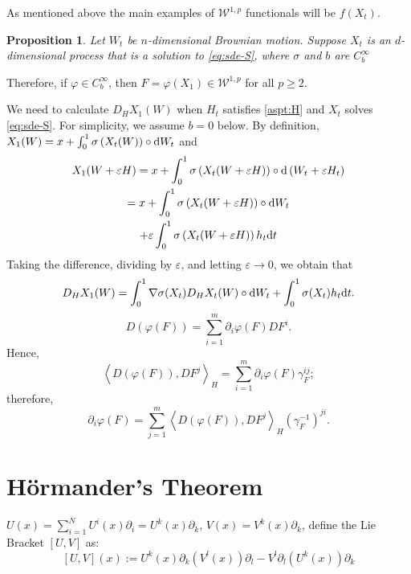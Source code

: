 \documentclass[twoside, 12pt]{book}
\numberwithin{equation}{chapter}
\newtheorem{proposition}[theorem]{Proposition}
\def\sW{{\mathscr W}}
\def\geq{\geqslant}
\def\p{\partial}
\def\d{\text{\rm{d}}}
\def\eps{\varepsilon}
\begin{document}
    As mentioned above the main examples of $\sW^{1,p}$ functionals will be $f(X_t)$.
    \begin{proposition}
        Let $W_t$ be $n$-dimensional Brownian motion. Suppose $X_t$ is an $d$-dimensional process that is a solution to \eqref{eq:sde-S}, where $\sigma$ and $b$ are $C^{\infty}_b$
    \end{proposition}
    Therefore, if $\varphi\in C^\infty_b$, then $F=\varphi\left(X_1\right)\in \sW^{1,p}$ for all $p \geq 2$. 

    
    We need to calculate $D_HX_1(W)$ when $H_t$ satisfies \eqref{aspt:H} and $X_t$ solves \eqref{eq:sde-S}. For simplicity, we assume $b=0$ below. By definition, $X_1(W)=x+\int_0^1 \sigma\left(X_t(W)\right) \circ \d W_t$ and 
    \begin{equation*}
    \begin{gathered}
    X_1(W+\varepsilon H)=x+\int_0^1 \sigma\left(X_t(W+\varepsilon H)\right) \circ \d\left(W_t+\varepsilon H_t\right) \\
    =x+\int_0^1 \sigma\left(X_t(W+\varepsilon H)\right) \circ \d W_t \\
    +\varepsilon \int_0^1 \sigma\left(X_t(W+\varepsilon H)\right) h_t \d t 
    \end{gathered}
    \end{equation*}
    Taking the difference, dividing by $\eps$, and letting $\eps\to0$, we obtain that
    \[
        D_HX_1(W)=\int_0^1\nabla \sigma(X_t) D_HX_t(W)\circ \d W_t+\int_0^1\sigma(X_t)h_t\d t. 
    \]
    $$
D(\varphi(F))=\sum_{i=1}^m \partial_i \varphi(F) D F^i .
$$
Hence, 
$$
\left\langle D(\varphi(F)), D F^j\right\rangle_H=\sum_{i=1}^m \partial_i \varphi(F) \gamma_F^{i j} ;
$$
therefore,
$$
\partial_i \varphi(F)=\sum_{j=1}^m\left\langle D(\varphi(F)), D F^j\right\rangle_H\left(\gamma_F^{-1}\right)^{j i} .
$$


    
    \section{}

    \section{Hörmander's Theorem}
	
	$U(x)=\sum_{i=1}^N U^i(x)\p_i=U^k(x)\partial_k$, $V(x)=V^k(x)\p_k$, define the Lie Bracket  $[U, V]$ as: 
	$$[U,V](x):= U^k(x) \p_k(V^l(x))\p_l-V^l\p_l(U^k(x))\p_k$$
	
\end{document}
